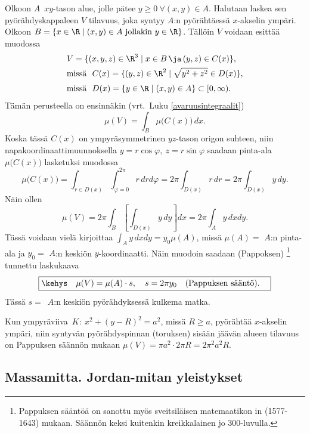 Olkoon $A$ $\,xy$-tason alue, jolle pätee $y \ge 0\ \forall (x,y) \in A$.
Halutaan laskea sen pyörähdyskappaleen $V$ tilavuus, joka syntyy $A$:n pyörähtäessä
$x$-akselin ympäri. Olkoon $B=\{x\in\R \mid (x,y)\in A\ \text{jollakin}\ y\in\R\}$.
Tällöin $V$ voidaan esittää muodossa
\begin{align*}
&V = \{(x,y,z)\in\R^3 \mid x \in B\,\ja\,(y,z) \in C(x)\}, \\
&\text{missä}\ \ C(x) = \{(y,z)\in\R^2 \mid \sqrt{y^2+z^2} \in D(x)\}, \\[1mm]
&\text{missä}\ \ D(x) =\{y\in\R \mid (x,y) \in A\} \subset [0,\infty).
\end{align*}
Tämän perusteella on ensinnäkin (vrt.\ Luku \ref{avaruusintegraalit})
\[
\mu(V)=\int_B \mu\bigl(C(x)\bigr)\,dx.
\]
Koska tässä $C(x)$ on ympyräsymmetrinen $yz$-tason origon suhteen, niin
napakoordinaattimuunnoksella $y=r\cos\varphi,\ z=r\sin\varphi$ saadaan
pinta-ala $\mu\bigl(C(x)\bigr)$ lasketuksi muodossa
\[
\mu\bigl(C(x)\bigr)=\int_{r \in D(x)}\int_{\varphi=0}^{2\pi} r\,drd\varphi
                   =2\pi\int_{D(x)} r\,dr
                   =2\pi\int_{D(x)} y\,dy.
\]
Näin ollen
\[
\mu(V) = 2\pi\int_B\left[\int_{D(x)} y\,dy\right]dx = 2\pi\int_A y\,dxdy.
\]
Tässä voidaan vielä kirjoittaa $\int_A y\,dxdy = y_0\mu(A)$, missä $\mu(A)=$ $A$:n
pinta-ala ja $y_0=$ $A$:n keskiön $y$-koordinaatti. Näin muodoin saadaan 
(Pappoksen) \footnote[2]{Pappuksen sääntöä on sanottu myös
 sveitsiläisen matemaatikon in (1577-1643) mukaan.
Säännön keksi kuitenkin kreikkalainen  jo 300-luvulla. 
 } tunnettu laskukaava
\[
\boxed{\kehys\quad \mu(V)=\mu(A) \cdot s, \quad s=2\pi y_0 \quad 
                                          \text{(Pappuksen sääntö)}. \quad}
\]
Tässä $s=\,$ $A$:n keskiön pyörähdyksessä kulkema matka.
\begin{Exa} Kun ympyräviiva $\,K:\ x^2+(y-R)^2=a^2$, missä $R \ge a$, pyörähtää 
$x$-akselin ympäri, niin syntyvän pyörähdyspinnan (toruksen) sisään jäävän alueen
tilavuus on Pappuksen säännön mukaan $\mu(V)=\pi a^2 \cdot 2\pi R = 2\pi^2 a^2 R$.
\loppu
\end{Exa}  

\subsection{Massamitta. Jordan-mitan yleistykset}

